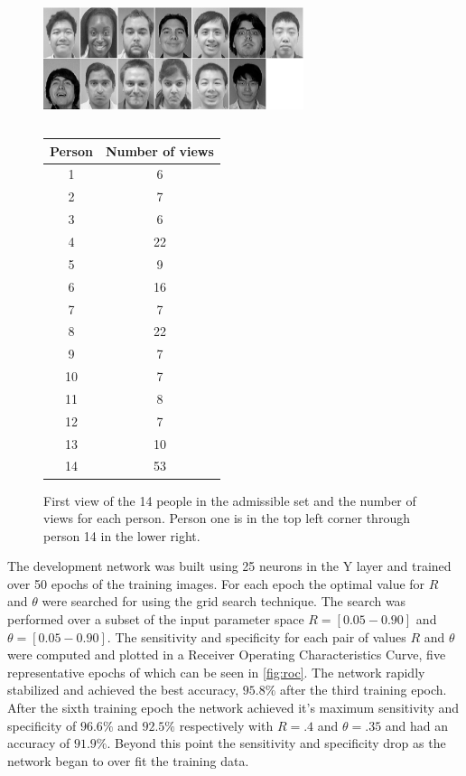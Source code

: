 \documentclass[conference]{IEEEtran}
\begin{document}
\begin{figure}
\center
\fontsize{8}{12}\selectfont
\includegraphics[width=3in]{training_faces.eps}
\begin{tabular}{c} \\[3ex] \end{tabular}
\begin{tabular}{|c|c|}
  \hline
  Person & Number of views\\
  \hline
  1 & 6\\
  2 & 7\\
  3 & 6\\
  4 & 22\\
  5 & 9\\
  6 & 16\\
  7 & 7\\
  8 & 22\\
  9 & 7\\
  10 & 7\\
  11 & 8\\
  12 & 7\\
  13 & 10\\
  14 & 53\\
  \hline
\end{tabular}
\caption{First view of the 14 people in the admissible set and the number of views for each person.  Person one is in the top left corner through person 14 in the lower right.}
\label{fig:training}
\end{figure}

The development network was built using 25 neurons in the Y layer and trained over 50 epochs of the training images.  For each epoch the optimal value for $R$ and $\theta$ were searched for using the grid search technique.  The search was performed over a subset of the input parameter space $R=[0.05-0.90]$ and $\theta=[0.05-0.90]$.  The sensitivity and specificity for each pair of values $R$ and $\theta$ were computed and plotted in a Receiver Operating Characteristics Curve, five representative epochs of which can be seen in \ref{fig:roc}. The network rapidly stabilized and achieved the best accuracy, $95.8\%$ after the third training epoch.  After the sixth training epoch the network achieved it's maximum sensitivity and specificity of $96.6\%$ and $92.5\%$ respectively with $R=.4$ and $\theta=.35$ and had an accuracy of $91.9\%$.  Beyond this point the sensitivity and specificity drop as the network began to over fit the training data.  
\end{document}
